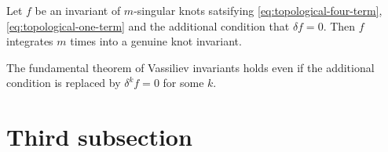 
\begin{theorem}
	\label{thm:fundamental-theorem-of-vassiliev-invariants}
	Let \(f\) be an invariant of \(m\)-singular knots satsifying \textup{\ref{eq:topological-four-term}}, \textup{\ref{eq:topological-one-term}} and the additional condition that \(\delta f = 0\). Then \(f\) integrates \(m\) times into a genuine knot invariant.
\end{theorem}

\begin{corollary}
	The fundamental theorem of Vassiliev invariants holds even if the additional condition is replaced by \(\delta^{k} f = 0\) for some \(k\).
\end{corollary}




\section{Third subsection}

